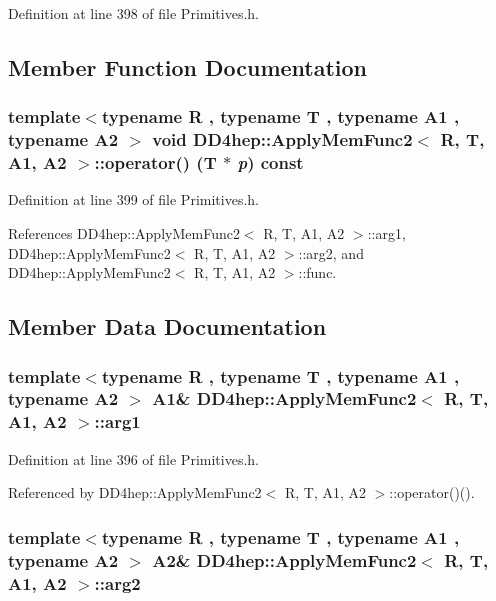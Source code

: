 Definition at line 398 of file Primitives.h.

\subsection{Member Function Documentation}
\hypertarget{struct_d_d4hep_1_1_apply_mem_func2_a2e2508f40e969ecf92735ea969efb1bb}{
\subsubsection[{operator()}]{\setlength{\rightskip}{0pt plus 5cm}template$<$typename R , typename T , typename A1 , typename A2 $>$ void {\bf DD4hep::ApplyMemFunc2}$<$ R, {\bf T}, A1, A2 $>$::operator() ({\bf T} $\ast$ {\em p}) const}}
\label{struct_d_d4hep_1_1_apply_mem_func2_a2e2508f40e969ecf92735ea969efb1bb}


Definition at line 399 of file Primitives.h.

References DD4hep::ApplyMemFunc2$<$ R, T, A1, A2 $>$::arg1, DD4hep::ApplyMemFunc2$<$ R, T, A1, A2 $>$::arg2, and DD4hep::ApplyMemFunc2$<$ R, T, A1, A2 $>$::func.

\subsection{Member Data Documentation}
\hypertarget{struct_d_d4hep_1_1_apply_mem_func2_a07f0ada96e3eb80a5934f530c994b3c2}{
\subsubsection[{arg1}]{\setlength{\rightskip}{0pt plus 5cm}template$<$typename R , typename T , typename A1 , typename A2 $>$ A1\& {\bf DD4hep::ApplyMemFunc2}$<$ R, {\bf T}, A1, A2 $>$::{\bf arg1}}}
\label{struct_d_d4hep_1_1_apply_mem_func2_a07f0ada96e3eb80a5934f530c994b3c2}


Definition at line 396 of file Primitives.h.

Referenced by DD4hep::ApplyMemFunc2$<$ R, T, A1, A2 $>$::operator()().\hypertarget{struct_d_d4hep_1_1_apply_mem_func2_a2c9f7dbd482c849c53ee6f499d6a0713}{
\subsubsection[{arg2}]{\setlength{\rightskip}{0pt plus 5cm}template$<$typename R , typename T , typename A1 , typename A2 $>$ A2\& {\bf DD4hep::ApplyMemFunc2}$<$ R, {\bf T}, A1, A2 $>$::{\bf arg2}}}
\label{struct_d_d4hep_1_1_apply_mem_func2_a2c9f7dbd482c849c53ee6f499d6a0713}



